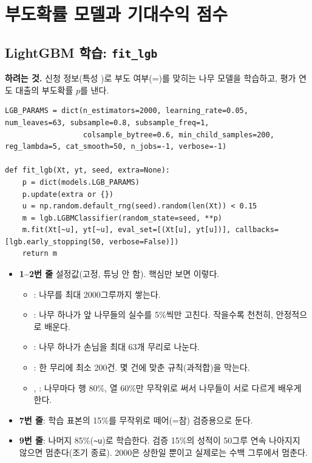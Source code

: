 \chapter{부도확률 모델과 기대수익 점수}

\section{LightGBM 학습: \texttt{fit\_lgb}}
\textbf{하려는 것.} 신청 정보(특성 )로 부도 여부(=)를 맞히는 나무 모델을 학습하고, 평가 연도 대출의 부도확률 $p$를 낸다.
\begin{lstlisting}
LGB_PARAMS = dict(n_estimators=2000, learning_rate=0.05, num_leaves=63, subsample=0.8, subsample_freq=1,
                  colsample_bytree=0.6, min_child_samples=200, reg_lambda=5, cat_smooth=50, n_jobs=-1, verbose=-1)

def fit_lgb(Xt, yt, seed, extra=None):
    p = dict(models.LGB_PARAMS)
    p.update(extra or {})
    u = np.random.default_rng(seed).random(len(Xt)) < 0.15
    m = lgb.LGBMClassifier(random_state=seed, **p)
    m.fit(Xt[~u], yt[~u], eval_set=[(Xt[u], yt[u])], callbacks=[lgb.early_stopping(50, verbose=False)])
    return m
\end{lstlisting}
\begin{itemize}[leftmargin=*]
\item \textbf{1--2번 줄} 설정값(고정, 튜닝 안 함). 핵심만 보면 이렇다.
  \begin{itemize}
  \item {}: 나무를 최대 2000그루까지 쌓는다.
  \item {}: 나무 하나가 앞 나무들의 실수를 5\%씩만 고친다. 작을수록 천천히, 안정적으로 배운다.
  \item {}: 나무 하나가 손님을 최대 63개 무리로 나눈다.
  \item {}: 한 무리에 최소 200건. 몇 건에 맞춘 규칙(과적합)을 막는다.
  \item {}, : 나무마다 행 80\%, 열 60\%만 무작위로 써서 나무들이 서로 다르게 배우게 한다.
  \end{itemize}
\item \textbf{7번 줄}: 학습 표본의 15\%를 무작위로 떼어(=참) 검증용으로 둔다.
\item \textbf{9번 줄}: 나머지 85\%(\texttt{\textasciitilde u})로 학습한다. 검증 15\%의 성적이 50그루 연속 나아지지 않으면 멈춘다(조기 종료). 2000은 상한일 뿐이고 실제로는 수백 그루에서 멈춘다.
\end{itemize}

